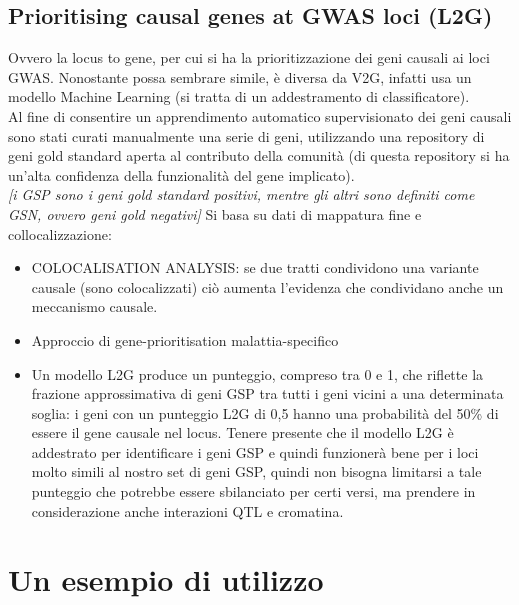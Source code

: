 \documentclass{article}
\begin{document}
\subsection{Prioritising causal genes at GWAS loci (L2G)}
Ovvero la locus to gene, per cui si ha la prioritizzazione dei geni causali ai loci GWAS. Nonostante possa sembrare simile, è diversa da V2G, infatti usa un modello Machine Learning (si tratta di un addestramento di classificatore).\\
Al fine di consentire un apprendimento automatico supervisionato dei geni causali sono stati curati manualmente una serie di geni, utilizzando una repository di geni gold standard aperta al contributo della comunità (di questa repository si ha un'alta confidenza della funzionalità del gene implicato).\\
\textit{[i GSP sono i geni gold standard positivi, mentre gli altri sono definiti come GSN, ovvero geni gold negativi]}
Si basa su dati di mappatura fine e collocalizzazione:
\begin{itemize}
    \item COLOCALISATION ANALYSIS: se due tratti condividono una variante causale (sono colocalizzati) ciò aumenta l'evidenza che condividano anche un meccanismo causale. 
    \item Approccio di gene-prioritisation malattia-specifico 
    \item Un modello L2G produce un punteggio, compreso tra 0 e 1, che riflette la frazione approssimativa di geni GSP tra tutti i geni vicini a una determinata soglia: i geni con un punteggio L2G di 0,5 hanno una probabilità del 50\% di essere il gene causale nel locus. Tenere presente che il modello L2G è addestrato per identificare i geni GSP e quindi funzionerà bene per i loci molto simili al nostro set di geni GSP, quindi non bisogna limitarsi a tale punteggio che potrebbe essere sbilanciato per certi versi, ma prendere in considerazione anche interazioni QTL e cromatina.  
\end{itemize}
\section{Un esempio di utilizzo}
\end{document}
